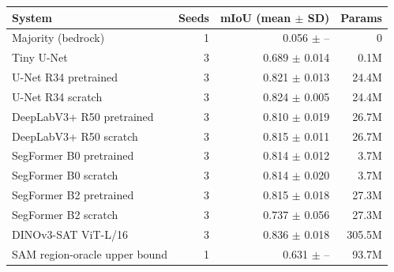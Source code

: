 \begin{tabular}{lrrr}
\toprule
System & Seeds & mIoU (mean $\pm$ SD) & Params \\
\midrule
Majority (bedrock) & 1 & 0.056 $\pm$ -- & 0 \\
Tiny U-Net & 3 & 0.689 $\pm$ 0.014 & 0.1M \\
U-Net R34 \textperiodcentered{} pretrained & 3 & 0.821 $\pm$ 0.013 & 24.4M \\
U-Net R34 \textperiodcentered{} scratch & 3 & 0.824 $\pm$ 0.005 & 24.4M \\
DeepLabV3+ R50 \textperiodcentered{} pretrained & 3 & 0.810 $\pm$ 0.019 & 26.7M \\
DeepLabV3+ R50 \textperiodcentered{} scratch & 3 & 0.815 $\pm$ 0.011 & 26.7M \\
SegFormer B0 \textperiodcentered{} pretrained & 3 & 0.814 $\pm$ 0.012 & 3.7M \\
SegFormer B0 \textperiodcentered{} scratch & 3 & 0.814 $\pm$ 0.020 & 3.7M \\
SegFormer B2 \textperiodcentered{} pretrained & 3 & 0.815 $\pm$ 0.018 & 27.3M \\
SegFormer B2 \textperiodcentered{} scratch & 3 & 0.737 $\pm$ 0.056 & 27.3M \\
DINOv3-SAT ViT-L/16 & 3 & 0.836 $\pm$ 0.018 & 305.5M \\
SAM region-oracle upper bound & 1 & 0.631 $\pm$ -- & 93.7M \\
\bottomrule
\end{tabular}
